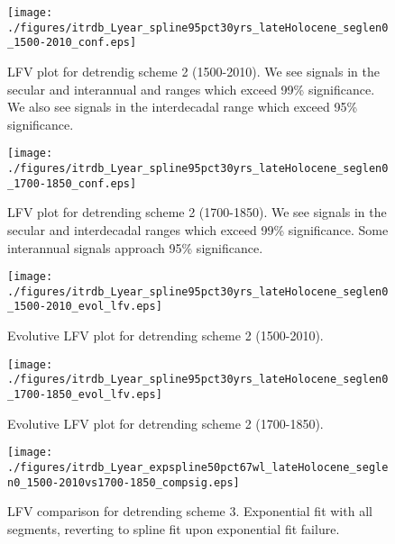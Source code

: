 \documentclass[phd,tocprelim]{cornell}
\begin{document}
\begin{figure}[!tbp]
\centering
\begin{minipage}[b]{0.45\textwidth}
\texttt{[image: ./figures/itrdb\_Lyear\_spline95pct30yrs\_lateHolocene\_seglen0\_1500-2010\_conf.eps]}
\caption{LFV plot for detrendig scheme 2 (1500-2010). We see signals in the secular and interannual and ranges which exceed 99\% significance. We also see signals in the interdecadal range which exceed 95\% significance.}
\label{conf2:1500}
\end{minipage}
\hfill
\begin{minipage}[b]{0.45\textwidth}
\texttt{[image: ./figures/itrdb\_Lyear\_spline95pct30yrs\_lateHolocene\_seglen0\_1700-1850\_conf.eps]}
\caption{LFV plot for detrending scheme 2 (1700-1850). We see signals in the secular and interdecadal ranges which exceed 99\% significance. Some interannual signals approach 95\% significance.}
\label{conf2:1700}
\end{minipage}
\end{figure}

\begin{figure}[!tbp]
\centering
\begin{minipage}[b]{0.45\textwidth}
\texttt{[image: ./figures/itrdb\_Lyear\_spline95pct30yrs\_lateHolocene\_seglen0\_1500-2010\_evol\_lfv.eps]}

\caption{Evolutive LFV plot for detrending scheme 2 (1500-2010).}
\label{evol2:1500}

\end{minipage}
\hfill
\begin{minipage}[b]{0.45\textwidth}
\texttt{[image: ./figures/itrdb\_Lyear\_spline95pct30yrs\_lateHolocene\_seglen0\_1700-1850\_evol\_lfv.eps]}
\caption{Evolutive LFV plot for detrending scheme 2 (1700-1850).}
\label{evol2:1700}
\end{minipage}
\end{figure}


\begin{figure}[!tbp]
\centering
\texttt{[image: ./figures/itrdb\_Lyear\_expspline50pct67wl\_lateHolocene\_seglen0\_1500-2010vs1700-1850\_compsig.eps]}

\noindent{}

\caption{LFV comparison for detrending scheme 3. Exponential fit with all segments, reverting to spline fit upon exponential fit failure.}

\label{compsig3}
\end{figure}
\end{document}
